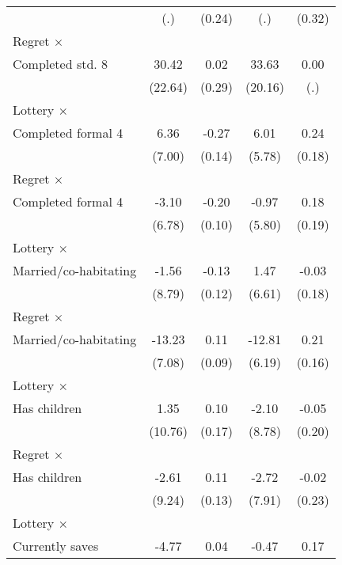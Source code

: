 \begin{table}[htbp]
\begin{tabular}{l*{4}{c}}
                &      (.)         &   (0.24)         &      (.)         &   (0.32)         \\
\addlinespace
Regret $\times$ \\ Completed std. 8&    30.42         &     0.02         &    33.63\sym{*}  &     0.00         \\
                &  (22.64)         &   (0.29)         &  (20.16)         &      (.)         \\
\addlinespace
Lottery $\times$ \\ Completed formal 4&     6.36         &    -0.27\sym{*}  &     6.01         &     0.24         \\
                &   (7.00)         &   (0.14)         &   (5.78)         &   (0.18)         \\
\addlinespace
Regret $\times$ \\ Completed formal 4&    -3.10         &    -0.20\sym{*}  &    -0.97         &     0.18         \\
                &   (6.78)         &   (0.10)         &   (5.80)         &   (0.19)         \\
\addlinespace
Lottery $\times$ \\ Married/co-habitating&    -1.56         &    -0.13         &     1.47         &    -0.03         \\
                &   (8.79)         &   (0.12)         &   (6.61)         &   (0.18)         \\
\addlinespace
Regret $\times$ \\ Married/co-habitating&   -13.23\sym{*}  &     0.11         &   -12.81\sym{**} &     0.21         \\
                &   (7.08)         &   (0.09)         &   (6.19)         &   (0.16)         \\
\addlinespace
Lottery $\times$ \\ Has children&     1.35         &     0.10         &    -2.10         &    -0.05         \\
                &  (10.76)         &   (0.17)         &   (8.78)         &   (0.20)         \\
\addlinespace
Regret $\times$ \\ Has children&    -2.61         &     0.11         &    -2.72         &    -0.02         \\
                &   (9.24)         &   (0.13)         &   (7.91)         &   (0.23)         \\
\addlinespace
Lottery $\times$ \\ Currently saves&    -4.77         &     0.04         &    -0.47         &     0.17         \\

\end{tabular}
\end{table}
